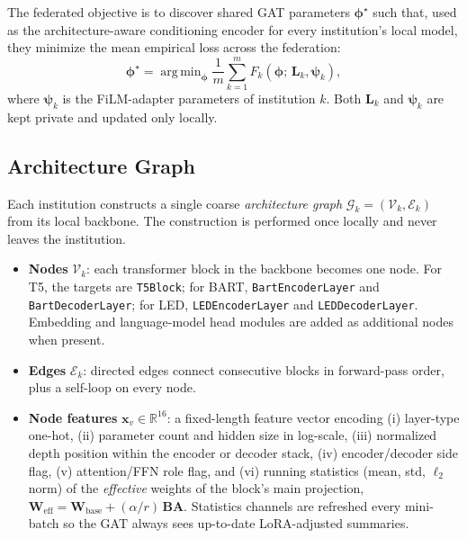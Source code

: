 \documentclass[11pt]{article}
\theoremstyle{plain}
\theoremstyle{definition}
\theoremstyle{remark}
\DeclareMathOperator*{\argmin}{arg\,min}
\begin{document}
The federated objective is to discover shared GAT
parameters $\boldsymbol{\phi}^\star$ such that, used
as the architecture-aware conditioning encoder for
every institution's local model, they minimize the
mean empirical loss across the federation:
\begin{equation}
  \boldsymbol{\phi}^\star
  = \argmin_{\boldsymbol{\phi}}
    \frac{1}{m}\sum_{k=1}^m
    F_k(\boldsymbol{\phi};\,\mathbf{L}_k,
    \boldsymbol{\psi}_k),
  \label{eq:global_objective}
\end{equation}
where $\boldsymbol{\psi}_k$ is the FiLM-adapter
parameters of institution $k$. Both $\mathbf{L}_k$
and $\boldsymbol{\psi}_k$ are kept private and updated
only locally.

\subsection{Architecture Graph}
\label{sec:arch_graph}

Each institution constructs a single coarse
\emph{architecture graph} $\mathcal{G}_k =
(\mathcal{V}_k, \mathcal{E}_k)$ from its local
backbone. The construction is performed once locally
and never leaves the institution.

\begin{itemize}[leftmargin=1.5em, itemsep=2pt]
  \item \textbf{Nodes} $\mathcal{V}_k$: each
  transformer block in the backbone becomes one node.
  For T5, the targets are \texttt{T5Block}; for BART,
  \texttt{BartEncoderLayer} and
  \texttt{BartDecoderLayer}; for LED,
  \texttt{LEDEncoderLayer} and
  \texttt{LEDDecoderLayer}. Embedding and
  language-model head modules are added as additional
  nodes when present.
  \item \textbf{Edges} $\mathcal{E}_k$: directed edges
  connect consecutive blocks in forward-pass order,
  plus a self-loop on every node.
  \item \textbf{Node features} $\mathbf{x}_v \in
  \mathbb{R}^{16}$: a fixed-length feature vector
  encoding (i) layer-type one-hot, (ii) parameter
  count and hidden size in log-scale, (iii) normalized
  depth position within the encoder or decoder stack,
  (iv) encoder/decoder side flag, (v) attention/FFN
  role flag, and (vi) running statistics (mean, std,
  $\ell_2$ norm) of the \emph{effective} weights of
  the block's main projection,
  $\mathbf{W}_{\text{eff}} = \mathbf{W}_{\text{base}}
  + (\alpha/r)\,\mathbf{B}\mathbf{A}$. Statistics
  channels are refreshed every mini-batch so the GAT
  always sees up-to-date LoRA-adjusted summaries.
\end{itemize}
\end{document}
